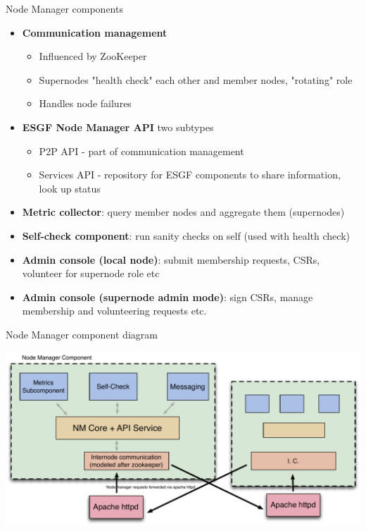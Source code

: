 \documentclass{beamer}
\begin{document}
\begin{frame}{Node Manager components}
\begin{itemize}

\item \textbf{Communication management}
\begin{itemize}
\item Influenced by ZooKeeper
\item Supernodes "health check" each other and member nodes, "rotating" role
\item Handles node failures
\end{itemize}


\item \textbf{ESGF Node Manager API} two subtypes
\begin{itemize}
\item P2P API - part of communication management
\item Services API - repository for ESGF components to share information, look up status
\end{itemize}


\item \textbf{Metric collector}: query member nodes and aggregate them (supernodes)
\item \textbf{Self-check component}: run sanity checks on self (used with health check)



\item \textbf{Admin console (local node)}: submit membership requests, CSRs, volunteer for supernode role etc
\item \textbf{Admin console (supernode admin mode)}: sign CSRs, manage membership and volunteering requests etc. 
\end{itemize}
\end{frame}

%
%
%




\begin{frame}{Node Manager component diagram}
\begin{center}
\includegraphics[scale=0.45]{NM-design-v2.pdf}
\end{center}
\end{frame}
\end{document}
